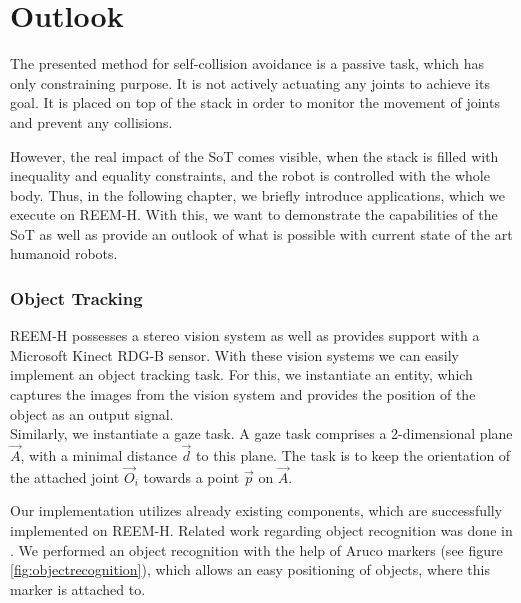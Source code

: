 \chapter{Outlook}
\label{chapter:applications}

The presented method for self-collision avoidance is a passive task, which has only constraining purpose. It is not actively actuating any joints to achieve its goal. It is placed on top of the stack in order to monitor the movement of joints and prevent any collisions. 

However, the real impact of the SoT comes visible, when the stack is filled with inequality and equality constraints, and the robot is controlled with the whole body. Thus, in the following chapter, we briefly introduce applications, which we execute on REEM-H. With this, we want to demonstrate the capabilities of the SoT as well as provide an outlook of what is possible with current state of the art humanoid robots.

\subsection*{Object Tracking}
REEM-H possesses a stereo vision system as well as provides support with a Microsoft Kinect RDG-B sensor. With these vision systems we can easily implement an object tracking task. For this, we instantiate an entity, which captures the images from the vision system and provides the position of the object as an output signal. \\
Similarly, we instantiate a gaze task. A gaze task comprises a 2-dimensional plane $\vec{A}$, with a minimal distance $\vec{d}$ to this plane. The task is to keep the orientation of the attached joint $\vec{O}_i$ towards a point $\vec{p}$ on $\vec{A}$. 

Our implementation utilizes already existing components, which are successfully implemented on REEM-H. Related work regarding object recognition was done in \cite{bence}. We performed an object recognition with the help of Aruco markers (see figure \ref{fig:objectrecognition}), which allows an easy positioning of objects, where this marker is attached to.

